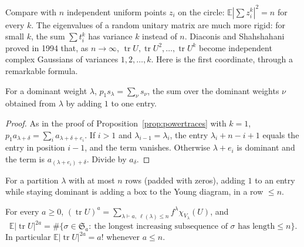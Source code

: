 Compare with $n$ independent uniform points $z_i$ on the circle: $\mathbb E|\sum z_i^k|^2=n$ for every $k$. The eigenvalues of a random unitary matrix are much more rigid: for small $k$, the sum $\sum t_i^k$ has variance $k$ instead of $n$. Diaconis and Shahshahani
proved in 1994 that, as $n\to\infty$, $\operatorname{tr}U,\operatorname{tr}U^2,\dots,\operatorname{tr}U^k$ become independent complex Gaussians of variances $1,2,\dots,k$. Here is the first coordinate, through a remarkable formula.

\begin{lemma}\label{lem:pieri}
For a dominant weight $\lambda$, $p_1s_\lambda=\sum_\nu s_\nu$, the sum over the dominant weights $\nu$ obtained from $\lambda$ by adding $1$ to one entry.
\end{lemma}

\begin{proof}
As in the proof of Proposition~\ref{prop:powertraces} with $k=1$, $p_1a_{\lambda+\delta}=\sum_ia_{\lambda+\delta+e_i}$. If $i>1$ and $\lambda_{i-1}=\lambda_i$, the entry $\lambda_i+n-i+1$ equals the entry in position $i-1$, and the term vanishes. Otherwise
$\lambda+e_i$ is dominant and the term is $a_{(\lambda+e_i)+\delta}$. Divide by $a_\delta$.
\end{proof}

For a partition $\lambda$ with at most $n$ rows (padded with zeros), adding $1$ to an entry while staying dominant is adding a box to the Young diagram, in a row $\le n$.

\begin{theorem}\label{thm:traces}
For every $a\ge0$, $(\operatorname{tr}U)^a=\sum_{\lambda\vdash a,\ \ell(\lambda)\le n}f^\lambda\chi_{V_\lambda}(U)$, and
\[
\mathbb E\bigl|\operatorname{tr}U\bigr|^{2a}=\#\bigl\{\sigma\in\mathfrak S_a:\ \text{the longest increasing subsequence of $\sigma$ has length}\le n\bigr\}.
\]
In particular $\mathbb E|\operatorname{tr}U|^{2a}=a!$ whenever $a\le n$.
\end{theorem}

